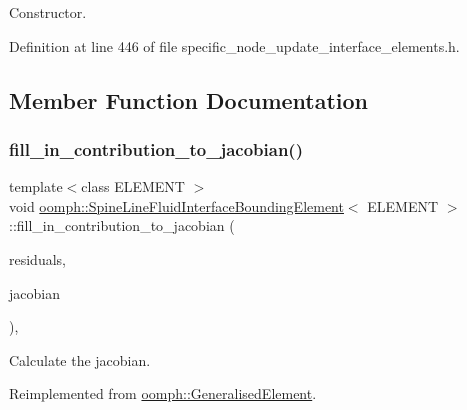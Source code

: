 Constructor. 



Definition at line 446 of file specific\+\_\+node\+\_\+update\+\_\+interface\+\_\+elements.\+h.



\subsection{Member Function Documentation}
\mbox{\label{classoomph_1_1SpineLineFluidInterfaceBoundingElement_a3f44f30b5cdc47b997dbc3fd463d2038}} 
\subsubsection{\texorpdfstring{fill\+\_\+in\+\_\+contribution\+\_\+to\+\_\+jacobian()}{fill\_in\_contribution\_to\_jacobian()}}
{\footnotesize\ttfamily template$<$class E\+L\+E\+M\+E\+NT $>$ \\
void \hyperlink{classoomph_1_1SpineLineFluidInterfaceBoundingElement}{oomph\+::\+Spine\+Line\+Fluid\+Interface\+Bounding\+Element}$<$ E\+L\+E\+M\+E\+NT $>$\+::fill\+\_\+in\+\_\+contribution\+\_\+to\+\_\+jacobian (\begin{DoxyParamCaption}\item[{\hyperlink{classoomph_1_1Vector}{Vector}$<$ double $>$ \&}]{residuals,  }\item[{\hyperlink{classoomph_1_1DenseMatrix}{Dense\+Matrix}$<$ double $>$ \&}]{jacobian }\end{DoxyParamCaption})\hspace{0.3cm}{\ttfamily [inline]}, {\ttfamily [virtual]}}



Calculate the jacobian. 



Reimplemented from \hyperlink{classoomph_1_1GeneralisedElement_a6ae09fc0d68e4309ac1b03583d252845}{oomph\+::\+Generalised\+Element}.



